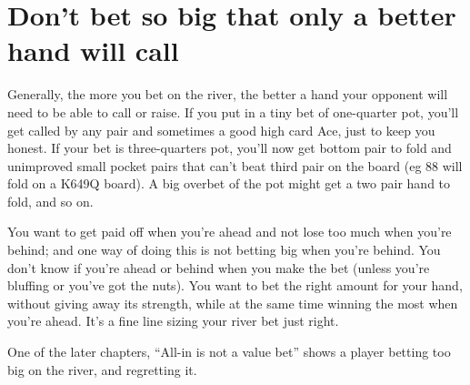 \section{Don't bet so big that only a better hand will call}

Generally, the more you bet on the river, the better a hand your
opponent will need to be able to call or raise. If you put in
a tiny bet of one-quarter pot, you'll get called by any pair and
sometimes a good high card Ace, just to keep you honest. If your
bet is three-quarters pot, you'll now get bottom pair to fold
and unimproved small pocket pairs that can't beat third pair on the
board (eg 88 will fold on a K649Q board). A big overbet of the pot
might get a two pair hand to fold, and so on.

You want to get paid off when you're ahead and not lose too much
when you're behind; and one way of doing this is not betting big when
you're behind. You don't know if you're ahead or behind when you
make the bet (unless you're bluffing or you've got the nuts). You
want to bet the right amount for your hand, without giving away
its strength, while at the same time winning the most when you're ahead.
It's a fine line sizing your river bet just right.

One of the later chapters, ``All-in is not a value bet'' shows a
player betting too big on the river, and regretting it.
